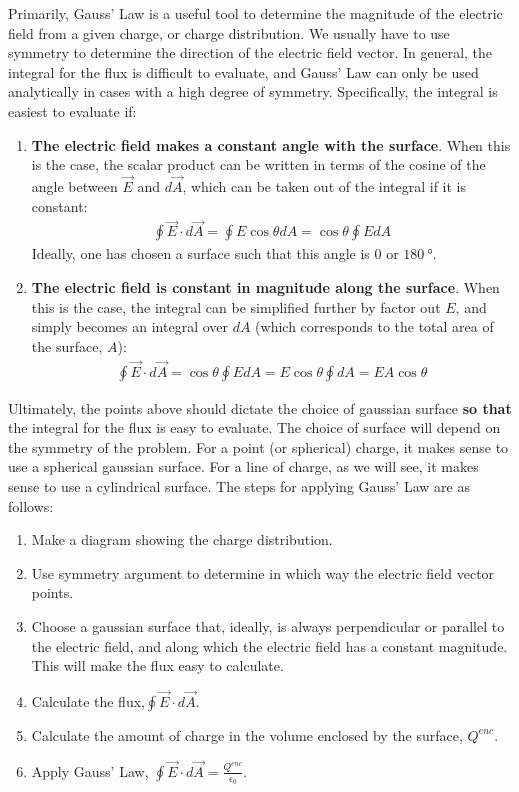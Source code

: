 Primarily, Gauss' Law is a useful tool to determine the magnitude of the electric field from a given charge, or charge distribution. We usually have to use symmetry to determine the direction of the electric field vector. In general, the integral for the flux is difficult to evaluate, and Gauss' Law can only be used analytically in cases with a high degree of symmetry. Specifically, the integral is easiest to evaluate if:
\begin{enumerate}
\item \textbf{The electric field makes a constant angle with the surface}. When this is the case, the scalar product can be written in terms of the cosine of the angle between $\vec E$ and $d\vec A$, which can be taken out of the integral if it is constant:
\begin{align*}
\oint \vec E\cdot d\vec A=\oint E\cos\theta dA=\cos\theta\oint EdA
\end{align*}
Ideally, one has chosen a surface such that this angle is $0$ or $\SI{180}{\degree}$.
\item \textbf{The electric field is constant in magnitude along the surface}. When this is the case, the integral can be simplified further by factor out $E$, and simply becomes an integral over $dA$ (which corresponds to the total area of the surface, $A$):
\begin{align*}
\oint \vec E\cdot d\vec A=\cos\theta\oint EdA =E\cos\theta\oint dA=EA\cos\theta 
\end{align*}
\end{enumerate}
Ultimately, the points above should dictate the choice of gaussian surface \textbf{so that} the integral for the flux is easy to evaluate. The choice of surface will depend on the symmetry of the problem. For a point (or spherical) charge, it makes sense to use a spherical gaussian surface. For a line of charge, as we will see, it makes sense to use a cylindrical surface. The steps for applying Gauss' Law are as follows:
\begin{enumerate}
\item Make a diagram showing the charge distribution.
\item Use symmetry argument to determine in which way the electric field vector points.
\item Choose a gaussian surface that, ideally, is always perpendicular or parallel to the electric field, and along which the electric field has a constant magnitude. This will make the flux easy to calculate.
\item Calculate the flux,$\oint \vec E\cdot d\vec A$.
\item Calculate the amount of charge in the volume enclosed by the surface, $Q^{enc}$.
\item Apply Gauss' Law, $\oint \vec E\cdot d\vec A=\frac{Q^{enc}}{\epsilon_0} $.
\end{enumerate}
